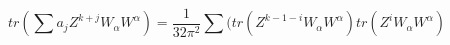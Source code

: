 \begin{equation}
tr(\sum a_j Z^{k+j} W_\alpha W^\alpha) =\frac{1}{32\pi^2}
\sum(tr(Z^{k-1-i}W_\alpha
W^\alpha)tr(Z^iW_\alpha W^\alpha)
\end{equation}

